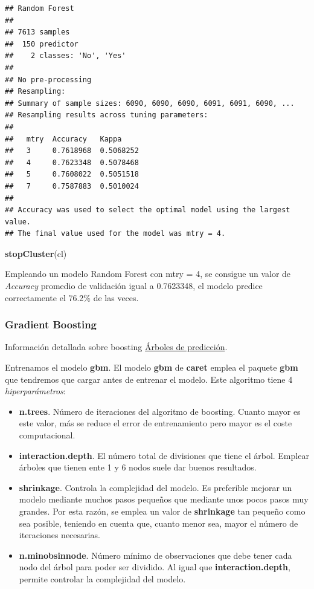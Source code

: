 \documentclass[]{article}
\newenvironment{Shaded}{\begin{snugshade}}{\end{snugshade}}
\newcommand{\KeywordTok}[1]{\textcolor[rgb]{0.13,0.29,0.53}{\textbf{#1}}}
\newcommand{\NormalTok}[1]{#1}
\begin{document}
\begin{verbatim}
## Random Forest 
## 
## 7613 samples
##  150 predictor
##    2 classes: 'No', 'Yes' 
## 
## No pre-processing
## Resampling: 
## Summary of sample sizes: 6090, 6090, 6090, 6091, 6091, 6090, ... 
## Resampling results across tuning parameters:
## 
##   mtry  Accuracy   Kappa    
##   3     0.7618968  0.5068252
##   4     0.7623348  0.5078468
##   5     0.7608022  0.5051518
##   7     0.7587883  0.5010024
## 
## Accuracy was used to select the optimal model using the largest value.
## The final value used for the model was mtry = 4.
\end{verbatim}

\begin{Shaded}
\begin{Highlighting}[]
\KeywordTok{stopCluster}\NormalTok{(cl)}
\end{Highlighting}
\end{Shaded}

Empleando un modelo Random Forest con mtry = 4, se consigue un
valor de \emph{Accuracy} promedio de validación igual a 0.7623348, el modelo
predice correctamente el 76.2\% de las veces.

\newpage

\hypertarget{gradient-boosting}{%
\subsubsection{Gradient Boosting}\label{gradient-boosting}}

Información detallada sobre boosting
\href{https://www.cienciadedatos.net/documentos/33_arboles_de_prediccion_bagging_random_forest_boosting}{\color{blue}Árboles
de predicción}.

Entrenamos el modelo \textbf{gbm}. El modelo \textbf{gbm} de \textbf{caret} emplea el paquete \textbf{gbm} que tendremos que cargar antes de entrenar el modelo. Este
algoritmo tiene 4 \emph{hiperparámetros}:

\begin{itemize}
\item
  \textbf{n.trees}. Número de iteraciones del algoritmo de boosting.
  Cuanto mayor es este valor, más se reduce el error de entrenamiento pero mayor es el coste computacional.
\item
  \textbf{interaction.depth}. El número total de divisiones que tiene el
  árbol. Emplear árboles que tienen ente 1 y 6 nodos suele dar buenos
  resultados.
\item
  \textbf{shrinkage}. Controla la complejidad del modelo. Es
  preferible mejorar un modelo mediante muchos pasos pequeños que
  mediante unos pocos pasos muy grandes. Por esta razón, se emplea un valor de
  \textbf{shrinkage} tan pequeño como sea posible, teniendo en cuenta
  que, cuanto menor sea, mayor el número de iteraciones necesarias. 
\item
  \textbf{n.minobsinnode}. Número mínimo de observaciones que debe tener
  cada nodo del árbol para poder ser dividido. Al igual que
  \textbf{interaction.depth}, permite controlar la complejidad del modelo.
\end{itemize}
\end{document}
